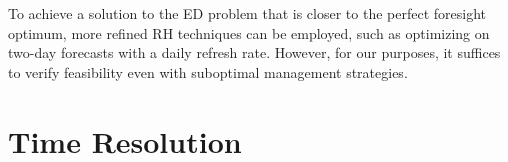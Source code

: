 \documentclass[smallextended,natbib]{svjour3}       %
\numberwithin{definition}{section}
\numberwithin{theorem}{section}
\numberwithin{proposition}{section}
\begin{document}
To achieve a solution to the ED problem that is closer to the perfect foresight optimum, more refined RH techniques can be employed, such as optimizing on two-day forecasts with a daily refresh rate.
However, for our purposes, %
it suffices to verify feasibility even with suboptimal management strategies.





































\section{Time Resolution}\label{section:time-resolution}
\end{document}
